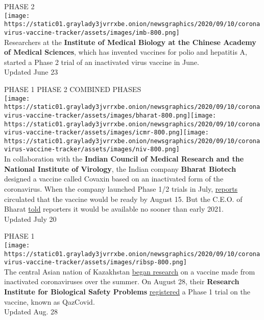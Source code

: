 PHASE 2\\
\texttt{[image: https://static01.graylady3jvrrxbe.onion/newsgraphics/2020/09/10/coronavirus-vaccine-tracker/assets/images/imb-800.png]}\\
Researchers at the \textbf{\textbf{Institute of Medical Biology at the
Chinese Academy of Medical Sciences}}, which has invented vaccines for
polio and hepatitis A, started a Phase 2 trial of an inactivated virus
vaccine in June.\\
Updated June 23

PHASE 1 PHASE 2 COMBINED PHASES\\
\texttt{[image: https://static01.graylady3jvrrxbe.onion/newsgraphics/2020/09/10/coronavirus-vaccine-tracker/assets/images/bharat-800.png]}\texttt{[image: https://static01.graylady3jvrrxbe.onion/newsgraphics/2020/09/10/coronavirus-vaccine-tracker/assets/images/icmr-800.png]}\texttt{[image: https://static01.graylady3jvrrxbe.onion/newsgraphics/2020/09/10/coronavirus-vaccine-tracker/assets/images/niv-800.png]}\\
In collaboration with the \textbf{\textbf{Indian Council of Medical
Research} and the \textbf{National Institute of Virology}}, the Indian
company \textbf{\textbf{Bharat Biotech}} designed a vaccine called
Covaxin based on an inactivated form of the coronavirus. When the
company launched Phase 1/2 trials in July,
\href{https://uk.reuters.com/article/uk-health-coronavirus-india-bharat-biote/health-experts-cast-doubt-on-indias-timeline-for-covid-vaccine-idUKKBN2440XD}{reports}
circulated that the vaccine would be ready by August 15. But the C.E.O.
of Bharat
\href{https://www.newindianexpress.com/nation/2020/jul/03/interview--covaxin-by-2021-if-all-goes-well-bharat-biotech-chairman-2164708.html}{told}
reporters it would be available no sooner than early 2021.\\
Updated July 20

PHASE 1\\
\texttt{[image: https://static01.graylady3jvrrxbe.onion/newsgraphics/2020/09/10/coronavirus-vaccine-tracker/assets/images/ribsp-800.png]}\\
The central Asian nation of Kazakhstan
\href{https://astanatimes.com/2020/08/human-trials-for-kazakh-covid-19-vaccine-to-start-in-september/}{began
research} on a vaccine made from inactivated coronaviruses over the
summer. On August 28, their \textbf{\textbf{Research Institute for
Biological Safety Problems}}
\href{https://clinicaltrials.gov/ct2/show/NCT04530357?term=vaccine\&recrs=adf\&cond=COVID-19\&phase=0123\&sort=nwst\&draw=2\&rank=1}{registered}
a Phase 1 trial on the vaccine, known as QazCovid.\\
Updated Aug. 28

